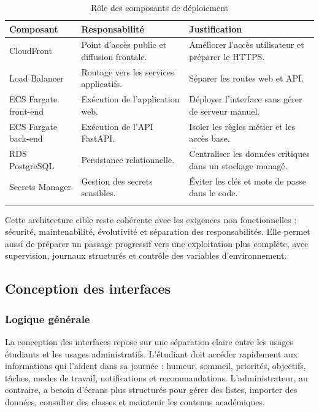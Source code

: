 \documentclass{rapportENSET}
\begin{document}
\begin{longtable}{@{}L{0.25\textwidth}L{0.36\textwidth}L{0.29\textwidth}@{}}
\toprule
\textbf{Composant} & \textbf{Responsabilité} & \textbf{Justification} \\
\midrule
\endhead
CloudFront & Point d'accès public et diffusion frontale. & Améliorer l'accès utilisateur et préparer le HTTPS. \\
Load Balancer & Routage vers les services applicatifs. & Séparer les routes web et API. \\
ECS Fargate front-end & Exécution de l'application web. & Déployer l'interface sans gérer de serveur manuel. \\
ECS Fargate back-end & Exécution de l'API FastAPI. & Isoler les règles métier et les accès base. \\
RDS PostgreSQL & Persistance relationnelle. & Centraliser les données critiques dans un stockage managé. \\
Secrets Manager & Gestion des secrets sensibles. & Éviter les clés et mots de passe dans le code. \\
\bottomrule
\caption{Rôle des composants de déploiement}
\end{longtable}

Cette architecture cible reste cohérente avec les exigences non fonctionnelles : sécurité, maintenabilité, évolutivité et séparation des responsabilités. Elle permet aussi de préparer un passage progressif vers une exploitation plus complète, avec supervision, journaux structurés et contrôle des variables d'environnement.

\subsection{Conception des interfaces}
\subsubsection*{Logique générale}
La conception des interfaces repose sur une séparation claire entre les usages étudiants et les usages administratifs. L'étudiant doit accéder rapidement aux informations qui l'aident dans sa journée : humeur, sommeil, priorités, objectifs, tâches, modes de travail, notifications et recommandations. L'administrateur, au contraire, a besoin d'écrans plus structurés pour gérer des listes, importer des données, consulter des classes et maintenir les contenus académiques.
\end{document}
